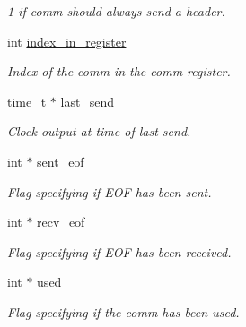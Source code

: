 \begin{DoxyCompactItemize}
\begin{DoxyCompactList}\small\item\em 1 if comm should always send a header. \end{DoxyCompactList}\item 
\mbox{\label{structcomm__t_a87f3a39926576e049b9ddc0cbabc9c95}} 
int \mbox{\hyperlink{structcomm__t_a87f3a39926576e049b9ddc0cbabc9c95}{index\+\_\+in\+\_\+register}}
\begin{DoxyCompactList}\small\item\em Index of the comm in the comm register. \end{DoxyCompactList}\item 
\mbox{\label{structcomm__t_adc0fcb148259e9801f63e70f7945e31b}} 
time\+\_\+t $\ast$ \mbox{\hyperlink{structcomm__t_adc0fcb148259e9801f63e70f7945e31b}{last\+\_\+send}}
\begin{DoxyCompactList}\small\item\em Clock output at time of last send. \end{DoxyCompactList}\item 
\mbox{\label{structcomm__t_a9c883133ed0ee04e11983dc7efbc8bfb}} 
int $\ast$ \mbox{\hyperlink{structcomm__t_a9c883133ed0ee04e11983dc7efbc8bfb}{sent\+\_\+eof}}
\begin{DoxyCompactList}\small\item\em Flag specifying if E\+OF has been sent. \end{DoxyCompactList}\item 
\mbox{\label{structcomm__t_a1d7418e5f54be56939a7f26b68a55f3d}} 
int $\ast$ \mbox{\hyperlink{structcomm__t_a1d7418e5f54be56939a7f26b68a55f3d}{recv\+\_\+eof}}
\begin{DoxyCompactList}\small\item\em Flag specifying if E\+OF has been received. \end{DoxyCompactList}\item 
\mbox{\label{structcomm__t_a7a90d80ee6c1826d0fc152dc3a3f61a1}} 
int $\ast$ \mbox{\hyperlink{structcomm__t_a7a90d80ee6c1826d0fc152dc3a3f61a1}{used}}
\begin{DoxyCompactList}\small\item\em Flag specifying if the comm has been used. \end{DoxyCompactList}\item 

\end{DoxyCompactItemize}
